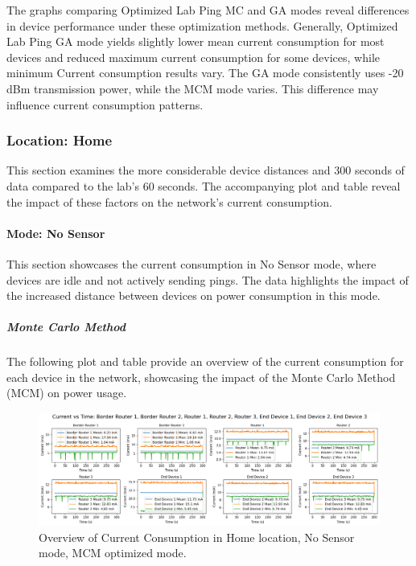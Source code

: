 The graphs comparing Optimized Lab Ping MC and GA modes reveal differences in device performance under these optimization methods. Generally, Optimized Lab Ping GA mode yields slightly lower mean current consumption for most devices and reduced maximum current consumption for some devices, while minimum Current consumption results vary. The GA mode consistently uses -20 dBm transmission power, while the MCM mode varies. This difference may influence current consumption patterns.


\subsubsection{Location: Home}
This section examines the more considerable device distances and 300 seconds of data compared to the lab's 60 seconds. The accompanying plot and table reveal the impact of these factors on the network's current consumption.

\paragraph{Mode: No Sensor}
This section showcases the current consumption in No Sensor mode, where devices are idle and not actively sending pings. The data highlights the impact of the increased distance between devices on power consumption in this mode.

\subparagraph{Monte Carlo Method}
The following plot and table provide an overview of the current consumption for each device in the network, showcasing the impact of the Monte Carlo Method (MCM) on power usage.

\begin{figure}[H]
  \centering
  \includegraphics[width=1\textwidth]{images/research_results/current_consumption_analysis/optimized/home/no_sensor/mc/overview.png}
    \caption{Overview of Current Consumption in Home location, No Sensor mode, MCM optimized mode.}
    \label{fig:overview_home_no_sensor_mc_overview}
\end{figure}

